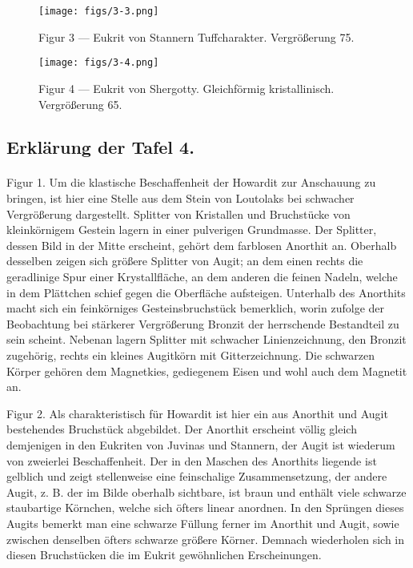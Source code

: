 \documentclass[a4paper, 11pt, oneside, polutonikogreek, german]{article}
\begin{document}
\vspace*{\fill}
\begin{figure}[H]
\centering
\texttt{[image: figs/3-3.png]}
\caption{\small Figur 3 --- Eukrit von Stannern Tuffcharakter. Vergrößerung 75.}
\end{figure}
\vspace*{\fill}
\clearpage

\vspace*{\fill}
\begin{figure}[H]
\centering
\texttt{[image: figs/3-4.png]}
\caption{\small Figur 4 --- Eukrit von Shergotty. Gleichförmig kristallinisch. Vergrößerung 65.}
\end{figure}
\vspace*{\fill}
\clearpage

\subsection{Erklärung der Tafel 4.}
\paragraph{}
Figur 1. Um die klastische Beschaffenheit der Howardit zur Anschauung zu bringen, ist hier eine Stelle aus dem Stein von Loutolaks bei schwacher Vergrößerung dargestellt. Splitter von Kristallen und Bruchstücke von kleinkörnigem Gestein lagern in einer pulverigen Grundmasse. Der Splitter, dessen Bild in der Mitte erscheint, gehört dem farblosen Anorthit an. Oberhalb desselben zeigen sich größere Splitter von Augit; an dem einen rechts die geradlinige Spur einer Krystallfläche, an dem anderen die feinen Nadeln, welche in dem Plättchen schief gegen die Oberfläche aufsteigen. Unterhalb des Anorthits macht sich ein feinkörniges Gesteinsbruchstück bemerklich, worin zufolge der Beobachtung bei stärkerer Vergrößerung Bronzit der herrschende Bestandteil zu sein scheint. Nebenan lagern Splitter mit schwacher Linienzeichnung, den Bronzit zugehörig, rechts ein kleines Augitkörn mit Gitterzeichnung. Die schwarzen Körper gehören dem Magnetkies, gediegenem Eisen und wohl auch dem Magnetit an.

Figur 2. Als charakteristisch für Howardit ist hier ein aus Anorthit und Augit bestehendes Bruchstück abgebildet. Der Anorthit erscheint völlig gleich demjenigen in den Eukriten von Juvinas und Stannern, der Augit ist wiederum von zweierlei Beschaffenheit. Der in den Maschen des Anorthits liegende ist gelblich und zeigt stellenweise eine feinschalige Zusammensetzung, der andere Augit, z. B. der im Bilde oberhalb sichtbare, ist braun und enthält viele schwarze staubartige Körnchen, welche sich öfters linear anordnen. In den Sprüngen dieses Augits bemerkt man eine schwarze Füllung ferner im Anorthit und Augit, sowie zwischen denselben öfters schwarze größere Körner. Demnach wiederholen sich in diesen Bruchstücken die im Eukrit gewöhnlichen Erscheinungen.
\end{document}
